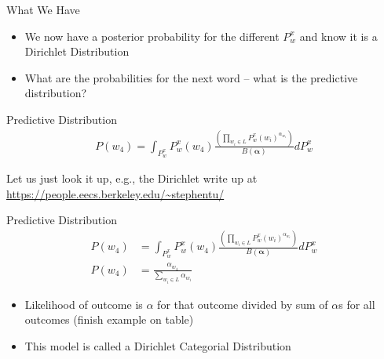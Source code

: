 \documentclass[11pt]{beamer}
\begin{document}
	\begin{frame}{What We Have}
		\begin{itemize}
			\item We now have a posterior probability for the different $P_{w}^{x}$ and know it is a Dirichlet Distribution
			\item What are the probabilities for the next word -- what is the predictive distribution?
		\end{itemize}
	\end{frame}
	
	\begin{frame}{Predictive Distribution}
		\begin{align*}
			P(w_4) = \int_{P_{w}^x} P_{w}^x(w_4) \frac{\left(\prod_{w_i \in L} P_{w}^{x}(w_i)^{\alpha_{w_i}}\right)}{B(\boldsymbol{\alpha})} d P_{w}^x
		\end{align*}
		
		\vspace{10pt} Let us just look it up, e.g., the Dirichlet write up at \url{https://people.eecs.berkeley.edu/~stephentu/} 
	\end{frame}
	
	\begin{frame}{Predictive Distribution}
		\begin{align*}
			P(w_4) & = \int_{P_{w}^x} P_{w}^x(w_4) \frac{\left(\prod_{w_i \in L} P_{w}^{x}(w_i)^{\alpha_{w_i}}\right)}{B(\boldsymbol{\alpha})} d P_{w}^x \\
			P(w_4) & = \frac{\alpha_{w_4}}{\sum_{w_i \in L} \alpha_{w_i}}
		\end{align*}
			
		\vspace{10pt}
		\begin{itemize}
			\item Likelihood of outcome is $\alpha$ for that outcome divided by sum of $\alpha$s for all outcomes (finish example on table)
			\item This model is called a Dirichlet Categorial Distribution
		\end{itemize}
		 
	\end{frame}
	
\end{document}
